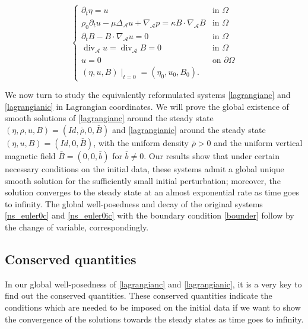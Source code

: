 \documentclass[a4paper,reqno,11pt]{amsart}
\numberwithin{equation}{section}
\begin{document}
\begin{equation}\label{lagrangianic}
\begin{cases}
\partial_t\eta=u & \text{in }
\Omega
 \\  \rho_0\partial_t u - \mu{\Delta_{\mathcal{A}}} u+{{\nabla}_{\mathcal{A}}} p=\kappa B\cdot\nabla_{\mathcal{A}} B & \text{in }
\Omega
 \\ \partial_t B-B\cdot\nabla_{\mathcal{A}} u=0& \text{in }
\Omega
\\ {\operatorname{div}_{\mathcal{A}}} u={\operatorname{div}_{\mathcal{A}}} B=0& \text{in }
\Omega \\
 {u}=0 &\text{on }{\partial}\Omega
\\ (\eta,  u,   B)\mid_{t=0}=( \eta_0, u_0,    B_0).
\end{cases}
\end{equation}

We now turn to study the equivalently reformulated systems \eqref{lagrangianc} and \eqref{lagrangianic} in Lagrangian coordinates. We will prove the global existence of smooth solutions of \eqref{lagrangianc} around the steady state $(\eta,\rho,  u,   B)=(Id,\bar\rho, 0,\bar B)$  and \eqref{lagrangianic} around the steady state $(\eta,   u,   B)=(Id,  0,\bar B)$, with the uniform density $\bar\rho>0$  and  the uniform vertical magnetic field $\bar B=(0,0,\bar b)$ for $\bar b\neq 0$. Our results show that under certain necessary conditions on the initial data, these systems admit a global unique smooth solution for the sufficiently small initial perturbation; moreover, the solution converges to the steady state at an almost exponential rate as time goes to infinity. The global well-posedness and decay of the original systems \eqref{ns_euler0c} and \eqref{ns_euler0ic} with the boundary condition \eqref{bounder} follow by the change of variable, correspondingly.

\subsection{Conserved quantities}

In our global well-posedness of \eqref{lagrangianc} and \eqref{lagrangianic}, it is a very key to find out the conserved quantities. These conserved quantities indicate the conditions which are needed to be imposed on the initial data if we want to show the convergence of the solutions towards the steady states as time goes to infinity.
\end{document}
